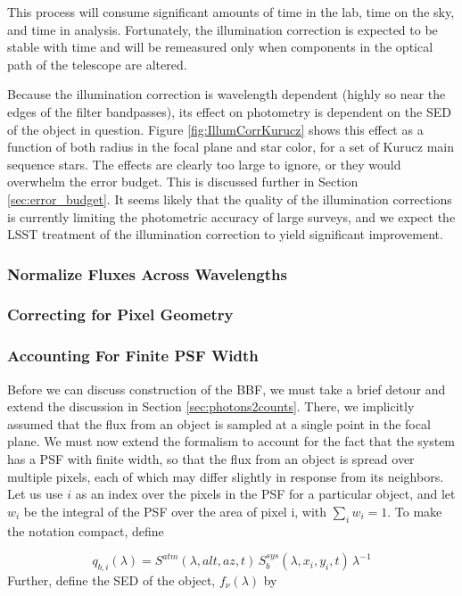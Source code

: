 \documentclass[12pt,preprint]{aastex}
\begin{document}
This process will consume significant amounts of time in the lab, time on the sky, and time in analysis.  
Fortunately, the illumination correction is expected to be stable with time and will be remeasured only when components in the
optical path of the telescope are altered.

Because the illumination correction is wavelength dependent (highly so near the edges of the filter bandpasses), its effect on photometry is dependent on the SED of the object in question.  Figure \ref{fig:IllumCorrKurucz} shows this effect as a function of both 
radius in the focal plane and star color, for a set of Kurucz main sequence stars.   The effects are clearly too large to ignore, or they would overwhelm the error budget.   This is discussed further in Section \ref{sec:error_budget}.  It seems likely that the quality 
of the illumination corrections is currently limiting the photometric accuracy of large surveys, and we expect the LSST treatment of the illumination correction to yield significant improvement.

\subsubsection{Normalize Fluxes Across Wavelengths}

\subsubsection{Correcting for Pixel Geometry}



\subsubsection{Accounting For Finite PSF Width}
\label{sec:pixelization}
Before we can discuss construction of the BBF, we must take a brief detour and extend the discussion in Section \ref{sec:photons2counts}.  There, we implicitly assumed that the flux from an object is sampled at a single point in the 
focal plane.  We must now extend the formalism to account for the fact that the system has a PSF with finite width, 
so that the flux from an object is spread
over multiple pixels, each of which may differ slightly in response from its neighbors.   Let us use $i$ as an index over the
pixels in the PSF for a particular object, and let $w_i$ be the integral of the PSF over the area of pixel i, with
$\sum_i{w_i}=1$.  To make the
notation compact, define

\begin{equation}
q_{b,i}(\lambda) = {S^{atm}(\lambda,alt,az,t)\, S_b^{sys}(\lambda,x_i,y_i,t) \, \lambda^{-1}}
\end{equation}
Further, define the SED of the object, $f_\nu(\lambda)$ by
\end{document}
